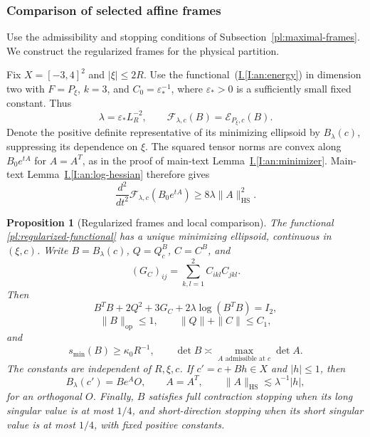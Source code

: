 \documentclass[11pt]{amsart}
\newtheorem{proposition}[theorem]{Proposition}
\theoremstyle{definition}
\theoremstyle{remark}
\numberwithin{equation}{section}
\newcommand{\partIref}[1]{\hyperref[I:#1]{I.\ref*{I:#1}}}
\newcommand{\partIeqref}[1]{\textup{(\partIref{#1})}}
\begin{document}
\subsubsection{Comparison of selected affine frames}\label{pl:frames}
Use the admissibility and stopping conditions of Subsection~\ref{pl:maximal-frames}. We construct the regularized frames for the physical partition.

Fix $X=[-3,4]^2$ and $|\xi|\le2R$. Use the functional~\partIeqref{an:energy} in dimension two with $F=P_\xi$, $k=3$, and $C_0=\varepsilon_*^{-1}$, where $\varepsilon_*>0$ is a sufficiently small fixed constant. Thus
\begin{equation}\label{pl:regularized-functional}
\lambda=\varepsilon_*L_R^{-2},\qquad \mathcal F_{\lambda,c}(B)=\mathscr E_{P_\xi,c}(B).
\end{equation}
Denote the positive definite representative of its minimizing ellipsoid by $B_\lambda(c)$, suppressing its dependence on $\xi$. The squared tensor norms are convex along $B_0e^{tA}$ for $A=A^T$, as in the proof of main-text Lemma~\partIref{an:minimizer}. Main-text Lemma~\partIref{an:log-hessian} therefore gives
\begin{equation}\label{pl:strong-convexity}
\frac{d^2}{dt^2}\mathcal F_{\lambda,c}(B_0e^{tA})\ge8\lambda\|A\|_{\mathrm{HS}}^2.
\end{equation}

\begin{proposition}[Regularized frames and local comparison]\label{pl:regularized-frames}
The functional \eqref{pl:regularized-functional} has a unique minimizing ellipsoid, continuous in $(\xi,c)$. Write $B=B_\lambda(c)$, $Q=Q_c^B$, $C=C^B$, and
\[
(G_C)_{ij}=\sum_{k,l=1}^2C_{ikl}C_{jkl}.
\]
Then
\begin{equation}\label{pl:regularized-balance}
B^TB+2Q^2+3G_C+2\lambda\log(B^TB)=I_2,
\end{equation}
\begin{equation}\label{pl:regularized-bounds}
\|B\|_{\mathrm{op}}\le1,\qquad \|Q\|+\|C\|\le C_1,
\end{equation}
and
\begin{equation}\label{pl:regularized-volume}
s_{\min}(B)\ge\kappa_0R^{-1},\qquad
\det B\asymp\max_{A\text{ admissible at }c}\det A.
\end{equation}
The constants are independent of $R,\xi,c$. If $c'=c+Bh\in X$ and $|h|\le1$, then
\begin{equation}\label{pl:frame-comparison}
B_\lambda(c')=Be^AO,
\qquad A=A^T,
\qquad \|A\|_{\mathrm{HS}}\lesssim \lambda^{-1}|h|,
\end{equation}
for an orthogonal $O$. Finally, $B$ satisfies full contraction stopping when its long singular value is at most $1/4$, and short-direction stopping when its short singular value is at most $1/4$, with fixed positive constants.
\end{proposition}
\end{document}
